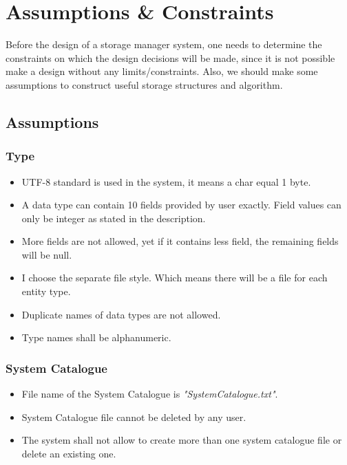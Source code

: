 \documentclass{article}
\begin{document}
        
    
\section{Assumptions \& Constraints}
Before the design of a storage manager system, one needs to determine the constraints on which the design decisions will be made, since it is not possible make a design without any limits/constraints. Also, we should make some assumptions to construct useful storage structures and algorithm.
    \subsection{Assumptions}
        \subsubsection{Type}
            \begin{itemize}
                \item UTF-8 standard is used in the system, it means a char equal 1 byte.
                \item A data type can contain 10 fields provided by user exactly. Field values can only be integer as stated in the description.
                \item More fields are not allowed, yet if it contains less field, the remaining fields will be null.
                \item I choose the separate file style. Which means there will be a file for each entity type.
                \item Duplicate names of data types are not allowed.
                \item Type names shall be alphanumeric.
            \end{itemize}
        \subsubsection{System Catalogue}
            \begin{itemize}
                \item File name of the System Catalogue is \emph{"SystemCatalogue.txt"}.
                \item System Catalogue file cannot be deleted by any user.
                \item The system shall not allow to create more than one system catalogue file or delete an existing one.
            \end{itemize}
\end{document}
